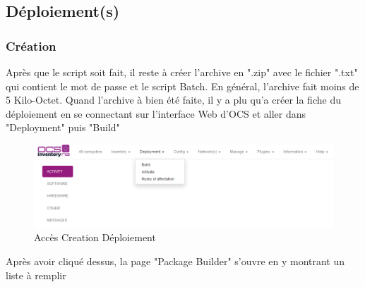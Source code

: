 \documentclass[11pt,a4paper,oneside]{article}
\begin{document}
\subsection{Déploiement(s)}
\subsubsection{Création}
Après que le script soit fait, il reste à créer l'archive en ".zip" avec le fichier ".txt" qui contient le mot de passe et le script Batch. En général, l'archive fait moins de 5 Kilo-Octet. Quand l'archive à bien été faite, il y a plu qu'a créer la fiche du déploiement en se connectant sur l'interface Web d'OCS et aller dans "Deployment" puis "Build"
\\
\begin{figure}[hbtp]
\centering
\includegraphics[scale=0.7]{Script/Deploiement1.PNG}
\caption{Accès Creation Déploiement}
\end{figure}

Après avoir cliqué dessus, la page "Package Builder" s'ouvre en y montrant un liste à remplir
\end{document}
